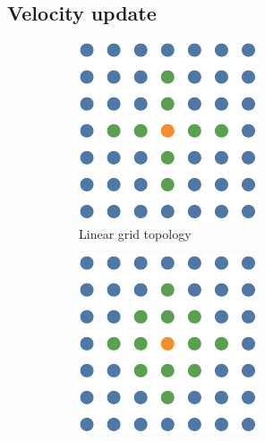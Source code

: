 \subsection{Velocity update}

\begin{figure}[t]
    \begin{subfigure}[t]{0.3\textwidth}
        \includegraphics[width=\textwidth]{img/master_neigh_linear.pdf}
        \caption{Linear grid topology}
        \label{fig:topologygridlinear}
    \end{subfigure}
    \hfill
    \begin{subfigure}[t]{0.3\textwidth}
        \includegraphics[width=\textwidth]{img/master_neigh_diamond.pdf}

\end{subfigure}
\end{figure}
